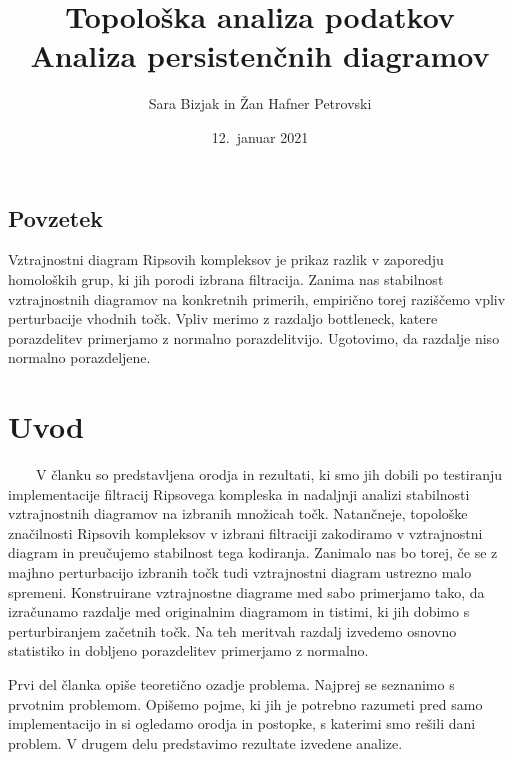 \documentclass[a4paper,11pt]{article}
\title{ Topološka analiza podatkov \\
\textbf{Analiza persistenčnih diagramov}
}
\author{Sara Bizjak in Žan Hafner Petrovski}
\date{12.~januar 2021}
\theoremstyle{definition}
\theoremstyle{plain}
\begin{document}
\maketitle

\begin{center}
\section*{Povzetek}
Vztrajnostni diagram Ripsovih kompleksov je prikaz razlik v zaporedju homoloških grup, ki jih porodi izbrana filtracija. 
Zanima nas stabilnost vztrajnostnih diagramov na konkretnih primerih, empirično torej raziščemo vpliv perturbacije vhodnih točk. 
Vpliv merimo z razdaljo bottleneck, katere porazdelitev primerjamo z normalno porazdelitvijo. 
Ugotovimo, da razdalje niso normalno porazdeljene. 
\end{center}


\section{Uvod}
\ \ \ \
V članku so predstavljena orodja in rezultati, ki smo jih dobili po testiranju implementacije filtracij 
Ripsovega kompleska in nadaljnji analizi stabilnosti vztrajnostnih diagramov na izbranih množicah točk.
Natančneje, topološke značilnosti Ripsovih kompleksov v izbrani filtraciji zakodiramo v vztrajnostni diagram in preučujemo stabilnost tega kodiranja.
Zanimalo nas bo torej, če se z majhno perturbacijo izbranih točk tudi vztrajnostni diagram ustrezno malo spremeni.
Konstruirane vztrajnostne diagrame med sabo primerjamo tako, da izračunamo razdalje med originalnim diagramom in tistimi, ki jih dobimo s perturbiranjem začetnih točk. 
Na teh meritvah razdalj izvedemo osnovno statistiko in dobljeno porazdelitev primerjamo z normalno.

Prvi del članka opiše teoretično ozadje problema. Najprej se seznanimo s prvotnim problemom. 
Opišemo pojme, ki jih je potrebno razumeti pred samo implementacijo in si ogledamo orodja in postopke, s katerimi smo rešili dani problem. 
V drugem delu predstavimo rezultate izvedene analize.

\end{document}
